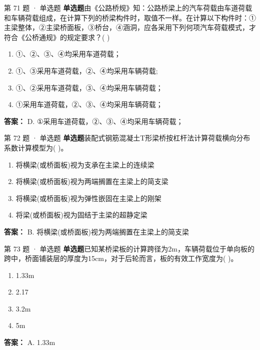 \documentclass[UTF8,zihao=-4,openany]{ctexbook}
\newenvironment{choices}{\begin{enumerate}[label=\Alph*.,leftmargin=9mm,labelsep=3mm,itemsep=2pt,topsep=4pt]}{\end{enumerate}}
\newcommand{\qtype}[1]{\textcolor{brand}{\sffamily\bfseries #1}}
\begin{document}
\begin{questionbox}{第 71 题 · 单选题}
\qtype{单选题}\quad 由《公路桥规》知：公路桥梁上的汽车荷载由车道荷载和车辆荷载组成，在计算下列的桥梁构件时，取值不一样。在计算以下构件时：①主梁整体，②主梁桥面板，③桥台，④涵洞，应各采用下列何项汽车荷载模式，才符合《公桥通规》的规定要求？( )
\begin{choices}
\item ①、②、③、④均采用车道荷载；
\item ①、③采用车道荷载，②、④均采用车辆荷载;
\item ①、②采用车道荷载，③、④均采用车辆荷载；
\item ①采用车道荷载，②、③、④均采用车辆荷载；
\end{choices}
\begin{answerbox}
\textbf{答案：} D. ①采用车道荷载，②、③、④均采用车辆荷载；
\end{answerbox}
\end{questionbox}

\begin{questionbox}{第 72 题 · 单选题}
\qtype{单选题}\quad 装配式钢筋混凝土T形梁桥按杠杆法计算荷载横向分布系数计算模型为( )。
\begin{choices}
\item 将横梁(或桥面板)视为支承在主梁上的连续梁
\item 将横梁(或桥面板)视为两端搁置在主梁上的简支梁
\item 将横梁(或桥面板)视为弹性嵌固在主梁上的刚架
\item 将梁(或桥面板)视为固结于主梁的超静定梁
\end{choices}
\begin{answerbox}
\textbf{答案：} B. 将横梁(或桥面板)视为两端搁置在主梁上的简支梁
\end{answerbox}
\end{questionbox}

\begin{questionbox}{第 73 题 · 单选题}
\qtype{单选题}\quad 已知某桥梁板的计算跨径为2m，车辆荷载位于单向板的跨中，桥面铺装层的厚度为15cm，对于后轮而言，板的有效工作宽度为( )。
\begin{choices}
\item 1.33m
\item 2.17
\item 3.2m
\item 5m
\end{choices}
\begin{answerbox}
\textbf{答案：} A. 1.33m
\end{answerbox}
\end{questionbox}
\end{document}
